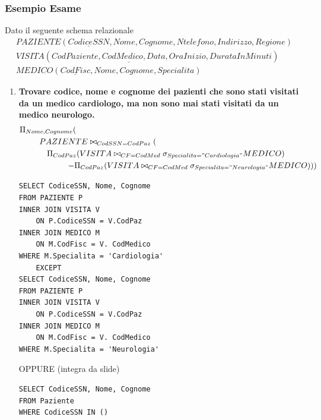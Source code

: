 \documentclass{article}
\begin{document}
\subsubsection{Esempio Esame}
Dato il seguente schema relazionale
\begin{align*}
	PAZIENTE(\underline{CodiceSSN},Nome,Cognome,Ntelefono,Indirizzo, Regione)\\
	VISITA(\underline{CodPaziente,CodMedico,Data,OraInizio}, DurataInMinuti)\\
	MEDICO(\underline{CodFisc},Nome,Cognome,Specialita)
\end{align*}

\begin{enumerate}
	\item \textbf{Trovare codice, nome e cognome dei pazienti che sono stati visitati da un medico cardiologo, ma non sono mai stati visitati da un medico neurologo.}
	\begin{align*}
		\Pi_{Nome,Cognome}(\qquad\qquad\qquad\qquad\qquad\qquad\qquad\qquad\qquad\qquad\qquad\qquad\qquad\qquad\qquad\\PAZIENTE\bowtie_{CodSSN = CodPaz}(\qquad\qquad\qquad\qquad\qquad\qquad\qquad\qquad\qquad\qquad\\\Pi_{CodPaz}(VISITA \bowtie_{CF=CodMed} \sigma_{Specialita = "Cardiologia"}MEDICO) \qquad\qquad\\- \Pi_{CodPaz}(VISITA \bowtie_{CF=CodMed} \sigma_{Specialita = "Neurologia"}MEDICO)))
	\end{align*}
	\begin{lstlisting}[style=sqlstyle]
SELECT CodiceSSN, Nome, Cognome
FROM PAZIENTE P
INNER JOIN VISITA V
	ON P.CodiceSSN = V.CodPaz
INNER JOIN MEDICO M
	ON M.CodFisc = V. CodMedico
WHERE M.Specialita = 'Cardiologia'
	EXCEPT
SELECT CodiceSSN, Nome, Cognome
FROM PAZIENTE P
INNER JOIN VISITA V
	ON P.CodiceSSN = V.CodPaz
INNER JOIN MEDICO M
	ON M.CodFisc = V. CodMedico
WHERE M.Specialita = 'Neurologia'
	\end{lstlisting}
	
OPPURE	 (integra da slide)
		\begin{lstlisting}[style=sqlstyle]
SELECT CodiceSSN, Nome, Cognome
FROM Paziente
WHERE CodiceSSN IN ()
	\end{lstlisting}
	

\end{enumerate}
\end{document}
